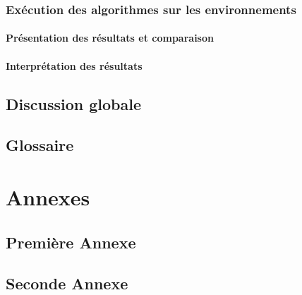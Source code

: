 \documentclass[pidr]{tnreport}
\begin{document}
	\section{Exécution des algorithmes sur les environnements}
		
		\subsection{Présentation des résultats et comparaison}
		
		\subsection{Interprétation des résultats}

\chapter{Discussion globale}

\clearpage
\renewcommand{\tocbibname}{Bibliographie / Webographie}


\clearpage

\listoffigures
\clearpage

\listoftables
\clearpage

\lstlistoflistings
\clearpage

\chapter*{Glossaire}

\clearpage
\renewcommand{\thesubsection}{\Roman{subsection}}

\appendix
\part*{Annexes}
\clearpage

\chapter{Première Annexe}
\clearpage

\chapter{Seconde Annexe}


\clearpage
\thispagestyle{empty}
\end{document}
